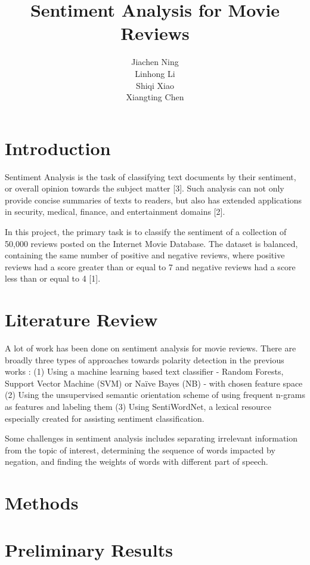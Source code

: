 \documentclass{article}
\title{Sentiment Analysis for Movie Reviews}
\author{%
  Jiachen Ning\\
  \AND 
  Linhong Li \\ 
  \AND 
  Shiqi Xiao \\ 
  \AND 
   Xiangting Chen \\
}
\begin{document}

\maketitle

\section{Introduction}

Sentiment Analysis is the task of classifying text documents by their sentiment, or overall opinion towards the subject matter [3]. Such analysis can not only provide concise summaries of texts to readers, but also has extended applications in security, medical, finance, and entertainment domains [2].

In this project, the primary task is to classify the sentiment of a collection of 50,000 reviews posted on the Internet Movie Database. The dataset is balanced, containing the same number of positive and negative reviews, where positive reviews had a score greater than or equal to 7 and negative reviews had a score less than or equal to 4 [1]. 


\section{Literature Review}

A lot of work has been done on sentiment analysis for movie reviews. There are broadly three types of approaches towards polarity detection in the previous works : (1) Using a machine learning based text classifier - Random Forests, Support Vector Machine (SVM) or Na{\"i}ve Bayes (NB) - with chosen feature space (2) Using the unsupervised semantic orientation scheme of using frequent n-grams as features and labeling them (3) Using SentiWordNet, a lexical resource especially created for assisting sentiment classification.

Some challenges in sentiment analysis includes separating irrelevant information from the topic of interest, determining the sequence of words impacted by negation, and finding the weights of words with different part of speech.

\section{Methods}

\section{Preliminary Results}
\end{document}
